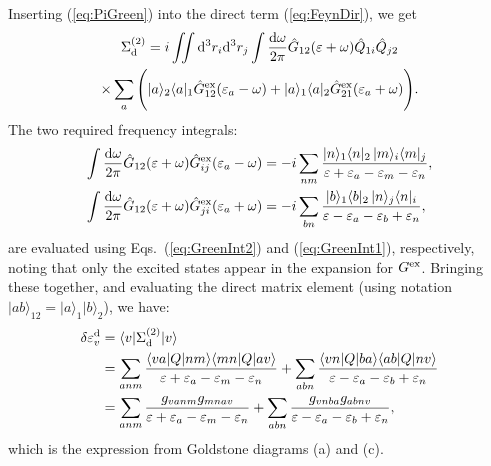 \documentclass[10pt,twocolumn,a4paper]{article}%
\newcommand{\bra}[1]{\ensuremath{\langle #1|}}	%
\newcommand{\ket}[1]{\ensuremath{|#1\rangle}}
\def\d{\ensuremath{{\rm d}}}
\def\en{\ensuremath{\varepsilon}}
\newcommand{\w}{\ensuremath{\omega}}
\begin{document}
Inserting (\ref{eq:PiGreen}) into the direct term (\ref{eq:FeynDir}), we get
\begin{multline}
\Sigma^{(2)}_{\rm d}
= i\iint\d^3 r_i\d^3 r_j
\int\frac{\d\w}{2\pi}
\hat G_{12}(\en+\w) \hat Q_{1i}\hat Q_{j2}\\
\times \sum_a\Bigg(
\ket{a}_2\bra{a}_1\hat G^{\rm ex}_{12}(\en_a-\w)
+\ket{a}_1\bra{a}_2\hat G^{\rm ex}_{21}(\en_a+\w)
\Bigg).
\end{multline}
%
The two required frequency integrals:
\begin{align}
\begin{split}
\int \frac{\d \w}{2\pi}\hat G_{12}(\en+\w) \hat G^{\rm ex}_{ij}(\en_a - \omega)
&=
-i\sum_{nm}
\frac{\ket{n}_1\bra{n}_2 \, \ket{m}_i\bra{m}_j}{\en+ \en_a - \en_m - \en_n},
\\
\int \frac{\d \w}{2\pi}\hat G_{12}(\en+\w) \hat G^{\rm ex}_{ji}(\en_a + \omega)
&=
-i\sum_{bn}
\frac{\ket{b}_1\bra{b}_2 \, \ket{n}_j\bra{n}_i}{\en - \en_a - \en_b + \en_n},
\end{split}
\end{align}
are evaluated using Eqs.~(\ref{eq:GreenInt2}) and (\ref{eq:GreenInt1}), respectively, noting that only the excited states appear in the expansion for $G^{\rm ex}$.
%
Bringing these together, and evaluating the direct matrix element  (using notation $\ket{ab}_{12}=\ket{a}_1\ket{b}_2$), we have:
\begin{align}
\delta\en_v^{\rm d}&=\bra{v}\Sigma^{(2)}_{\rm d}\ket{v}\notag\\
&=\sum_{anm}\frac{\bra{va}Q\ket{nm} \bra{mn}Q\ket{av}}{\en+\en_a-\en_m-\en_n}
+\sum_{abn}\frac{\bra{vn}Q\ket{ba} \bra{ab}Q\ket{nv}}{\en-\en_a-\en_b+\en_n} \notag\\
&=\sum_{anm}\frac{g_{vanm}g_{mnav}}{\en+\en_a-\en_m-\en_n}
+\sum_{abn}\frac{g_{vnba}g_{abnv}}{\en-\en_a-\en_b+\en_n},
\end{align}
which is the expression from Goldstone diagrams (a) and (c).
\end{document}
